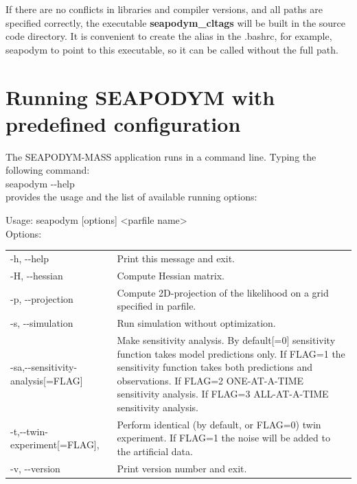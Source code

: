 \vspace{0.5cm}

If there are no conflicts in libraries and compiler versions, and all paths are specified correctly, the executable {\bfseries seapodym\_cltags} will be built in the source code directory. It is convenient to create the alias in the .bashrc, for example, {\ttfamily seapodym} to point to this executable, so it can be called without the full path.

\section{Running SEAPODYM with predefined configuration} 
\label{sec:firstrun}

The SEAPODYM-MASS application runs in a command line. Typing the following command:\\

{\ttfamily seapodym -{}-help}\\

provides the usage and the list of available running options:

{\ttfamily 

  Usage: seapodym [options] <parfile name> \\ 

  Options: \\
  \begin{tabular}[here]{lp{9cm}}
    -h, -{}-help 			 & Print this message and exit. \\
    -H, -{}-hessian 		 &Compute Hessian matrix. \\
    -p, -{}-projection 		 &Compute 2D-projection of the likelihood on a grid specified in parfile. \\
    -s, -{}-simulation 		 &Run simulation without optimization. \\
    -sa,-{}-sensitivity-analysis[=FLAG] & Make sensitivity analysis. By default[=0] sensitivity function takes model predictions only. 	If FLAG=1 the sensitivity function takes both predictions and observations.  If FLAG=2 ONE-AT-A-TIME sensitivity analysis. If FLAG=3 ALL-AT-A-TIME sensitivity analysis.  \\
    -t,-{}-twin-experiment[=FLAG], & Perform identical (by default, or FLAG=0) twin experiment. If FLAG=1 the noise will be added to the artificial data. \\
    -v, -{}-version 		 &Print version number and exit. \\
  \end{tabular}
}

